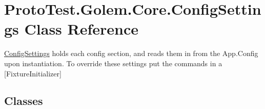 \hypertarget{class_proto_test_1_1_golem_1_1_core_1_1_config_settings}{\section{Proto\-Test.\-Golem.\-Core.\-Config\-Settings Class Reference}
\label{class_proto_test_1_1_golem_1_1_core_1_1_config_settings}
}


\hyperlink{class_proto_test_1_1_golem_1_1_core_1_1_config_settings}{Config\-Settings} holds each config section, and reads them in from the App.\-Config upon instantiation. To override these settings put the commands in a \mbox{[}Fixture\-Initializer\mbox{]}  


\subsection*{Classes}
